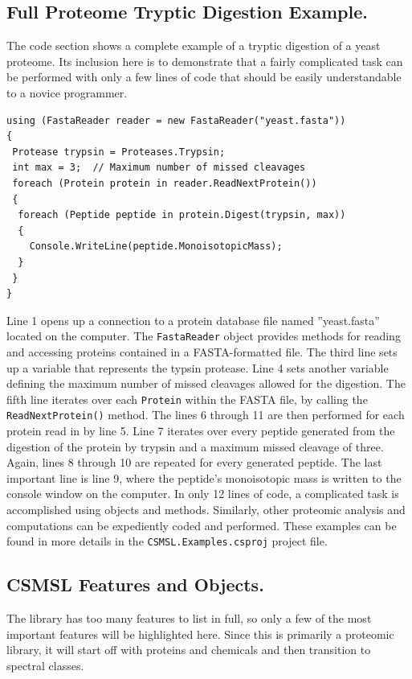 \subsection*{Full Proteome Tryptic Digestion Example.} The code section shows a complete example of a tryptic digestion of a yeast proteome. Its inclusion here is to demonstrate that a fairly complicated task can be performed with only a few lines of code that should be easily understandable to a novice programmer.
\begin{lstlisting}
using (FastaReader reader = new FastaReader("yeast.fasta"))
{
 Protease trypsin = Proteases.Trypsin;
 int max = 3;  // Maximum number of missed cleavages
 foreach (Protein protein in reader.ReadNextProtein())
 {
  foreach (Peptide peptide in protein.Digest(trypsin, max))
  {
    Console.WriteLine(peptide.MonoisotopicMass);  
  }
 }
}       
\end{lstlisting}
Line 1 opens up a connection to a protein database file named ''yeast.fasta'' located on the computer. The \texttt{FastaReader} object provides methods for reading and accessing proteins contained in a FASTA-formatted file. The third line sets up a variable that represents the typsin protease. Line 4 sets another variable defining the maximum number of missed cleavages allowed for the digestion. The fifth line iterates over each \texttt{Protein} within the FASTA file, by calling the \texttt{ReadNextProtein()} method. The lines 6 through 11 are then performed for each protein read in by line 5. Line 7 iterates over every peptide generated from the digestion of the protein by trypsin and a maximum missed cleavage of three. Again, lines 8 through 10 are repeated for every generated peptide. The last important line is line 9, where the peptide's monoisotopic mass is written to the console window on the computer. In only 12 lines of code, a complicated task is accomplished using \csmsl{} objects and methods. Similarly, other proteomic analysis and computations can be expediently coded and performed. These examples can be found in more details in the \texttt{CSMSL.Examples.csproj} project file.

\subsection*{CSMSL Features and Objects.}
The \csmsl{} library has too many features to list in full, so only a few of the most important features will be highlighted here. Since this is primarily a proteomic library, it will start off with proteins and chemicals and then transition to spectral classes. 

